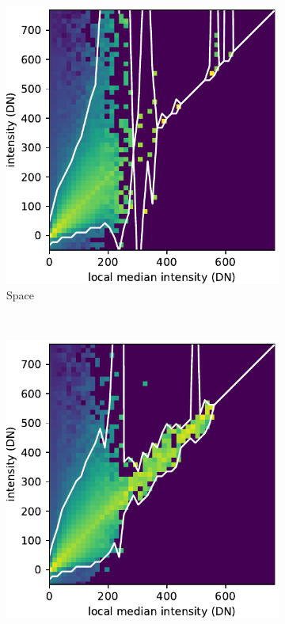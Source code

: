 \documentclass[10pt,letterpaper, doublespace]{article}
\begin{document}
\begin{figure}[h!]
\begin{subfigure}[t]{0.288\textwidth}
				\includegraphics[width=\textwidth]{fig/hist_1}
					\caption{Space}
				\end{subfigure}
				~ 
				\begin{subfigure}[t]{0.288\textwidth}
					\centering
					\includegraphics[width=\textwidth]{fig/hist_2}

\end{subfigure}
\end{figure}
\end{document}
